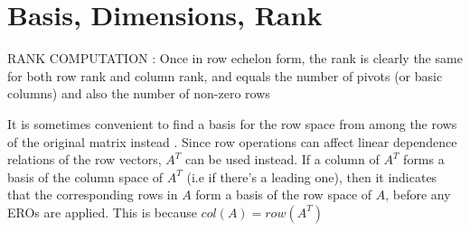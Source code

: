 \documentclass[english,course]{Notes}
\begin{document}
	      	\section{Basis, Dimensions, Rank}
		
	      	
	      	
	      	 RANK COMPUTATION : Once in row echelon form, the rank is clearly the same for both row rank and column rank, and equals the number of pivots (or basic columns) and also the number of non-zero rows
		
		\par{It is sometimes convenient to find a basis for the row space from among the rows of the original matrix instead . Since row operations can affect linear dependence relations of the row vectors, $A^{T}$ can be used instead. If a column of $A^{T}$ forms a basis of the column space of $A^{T}$ (i.e if there's a leading one), then it indicates that the corresponding rows in $A$ form a basis of the row space of $A$, before any EROs are applied. This is because $col(A) = row(A^{T})$  }
	      	
		
		
		
	      	
\end{document}
